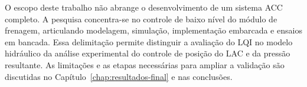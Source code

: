 O escopo deste trabalho não abrange o desenvolvimento de um sistema ACC completo. A pesquisa concentra-se no controle de baixo nível do módulo de frenagem, articulando modelagem, simulação, implementação embarcada e ensaios em bancada. Essa delimitação permite distinguir a avaliação do LQI no modelo hidráulico da análise experimental do controle de posição do LAC e da pressão resultante. As limitações e as etapas necessárias para ampliar a validação são discutidas no Capítulo~\ref{chap:resultados-final} e nas conclusões.